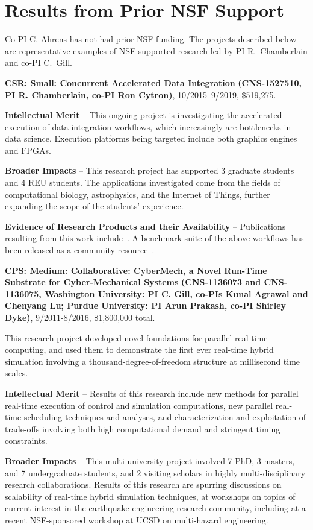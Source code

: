 \section{Results from Prior NSF Support}
\label{sec:prior}

Co-PI C. Ahrens has not had prior NSF funding. The projects described
below are representative examples of NSF-supported research led by PI 
R.~Chamberlain and co-PI C.~Gill.

\noindent
{\large\bf CSR: Small: Concurrent Accelerated Data Integration}
{\bf (CNS-1527510,
PI R. Chamberlain, co-PI Ron Cytron)}, 
10/2015--9/2019, \$519,275.  

\textbf{Intellectual Merit} -- This ongoing project is investigating the
accelerated execution of data integration workflows, which
increasingly are bottlenecks in data science. Execution platforms
being targeted include both graphics engines and FPGAs.

\textbf{Broader Impacts} -- This research project has supported 3
graduate students and 4 REU students.  The applications investigated
come from the fields of computational biology, astrophysics, and the
Internet of Things, further expanding the scope of the students'
experience.

\textbf{Evidence of Research Products and their Availability} --
Publications resulting from this work include~\cite{cc19,dibs,c17,fcbmc19,mgc16,js16}.
A benchmark suite of the above workflows has been released
as a community resource~\cite{dibsv1}.

\noindent
{\large\bf CPS: Medium: Collaborative: CyberMech, a Novel Run-Time Substrate for 
Cyber-Mechanical Systems}
{\bf (CNS-1136073 and CNS-1136075,
Washington University: PI C. Gill, co-PIs Kunal Agrawal and Chenyang Lu; Purdue University: PI Arun Prakash, co-PI Shirley Dyke)}, 9/2011-8/2016, \$1,800,000 total.  

This research project developed novel foundations for parallel real-time computing, and used them to demonstrate the first ever real-time hybrid simulation involving a thousand-degree-of-freedom structure at millisecond time scales.

\textbf{Intellectual Merit} -- Results of this research include new methods for parallel real-time execution of control and simulation computations, new parallel real-time scheduling techniques and analyses, and characterization and exploitation of trade-offs involving both high computational demand and stringent timing constraints.

\textbf{Broader Impacts} -- This multi-university project involved 7 PhD, 3 masters, and 7 undergraduate students, and 2 visiting scholars in highly multi-disciplinary research collaborations.  Results of this research are spurring discussions on scalability of real-time hybrid simulation techniques, at workshops on topics of current interest in the earthquake engineering research community, including at a recent NSF-sponsored workshop at UCSD on multi-hazard engineering.

